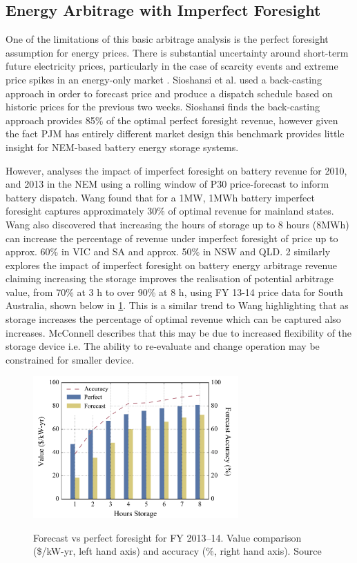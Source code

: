 \subsection{ Energy Arbitrage with Imperfect Foresight }
One of the limitations of this basic arbitrage analysis is the perfect foresight assumption for energy prices. There is substantial uncertainty around short-term future electricity prices, particularly in the case of scarcity events and extreme price spikes in an energy-only market \parencite{McConnell}. 
Sioshansi et al. used a back-casting approach in order to forecast price and produce a dispatch schedule based on historic prices for the previous two weeks. Sioshansi finds the back-casting approach provides 85\% of the optimal perfect foresight revenue, however given the fact PJM has entirely different market design this benchmark provides little insight for NEM-based battery energy storage systems. 

However, \parencite{Wang}  analyses the impact of imperfect foresight on battery revenue for 2010, and 2013 in the NEM using a rolling window of P30 price-forecast to inform battery dispatch. Wang found that for a 1MW, 1MWh battery imperfect foresight captures approximately 30\% of optimal revenue for mainland states. Wang also discovered that increasing the hours of storage up to 8 hours (8MWh) can increase the percentage of revenue under imperfect foresight of price up to approx. 60\% in VIC and SA and approx. 50\% in NSW and QLD.
2
\parencite{McConnell} similarly explores the impact of imperfect foresight on battery energy arbitrage revenue claiming increasing the storage improves the realisation of potential arbitrage value, from 70\% at 3 h to over 90\% at 8 h, using FY 13-14 price data for South Australia, shown below in \ref{fig:mcconnel_2014}. This is a similar trend to Wang highlighting that as storage increases the percentage of optimal revenue which can be captured also increases. McConnell describes that this may be due to increased flexibility of the storage device i.e. The ability to re-evaluate and change operation may be constrained for smaller device. 
\begin{figure}[H]
    \centering
    \includegraphics[width=0.7\textwidth]{Pictures/Chapter2/mcconnel.png}\
    \caption{Forecast vs perfect foresight for FY 2013–14. Value comparison (\$/kW-yr,
left hand axis) and accuracy (\%, right hand axis). Source \parencite{McConnell}}
    \label{fig:mcconnel_2014}
\end{figure}
